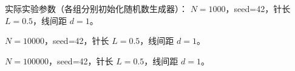 实际实验参数（各组分别初始化随机数生成器）：
$N=1000$，seed=42，针长 $L=0.5$，线间距 $d=1$。\par
$N=10000$，seed=42，针长 $L=0.5$，线间距 $d=1$。\par
$N=100000$，seed=42，针长 $L=0.5$，线间距 $d=1$。\par

